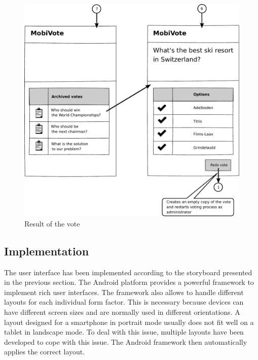\documentclass[numbers=noenddot, abstract=on, a4paper, headsepline,
footsepline, oneside, draft=off]{scrreprt}
\begin{document}
\begin{figure}[htb]
	\centering
	\includegraphics[height=.3\textheight]{img/storyboard/result}
	\caption{Result of the vote}
	\label{fig:result}
\end{figure}


\subsection{Implementation}
The user interface has been implemented according to the storyboard presented in
the previous section. The Android platform provides a powerful framework to
implement rich user interfaces. The framework also allows to handle different
layouts for each individual form factor. This is necessary because devices can
have different screen sizes and are normally used in different orientations. A
layout designed for a smartphone in portrait mode usually does not fit well on a
tablet in landscape mode. To deal with this issue, multiple layouts have been
developed to cope with this issue. The Android framework then automatically
applies the correct layout.
\end{document}
